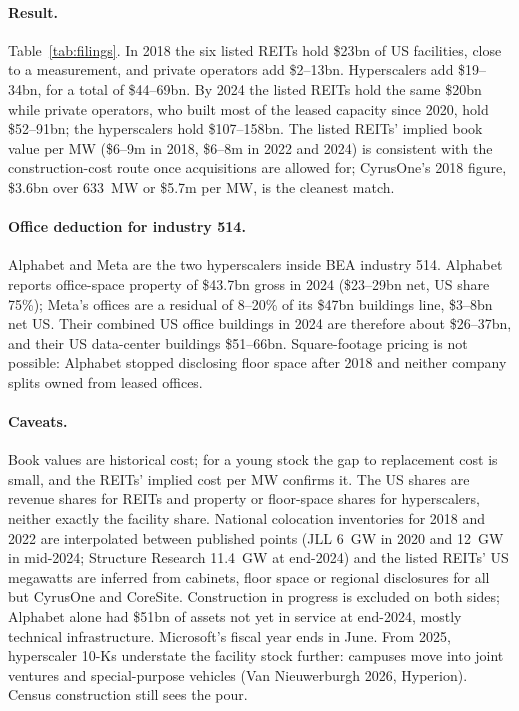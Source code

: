 \documentclass[11pt]{article}
\begin{document}
\paragraph{Result.} Table~\ref{tab:filings}. In 2018 the six listed REITs hold \$23bn of US facilities, close to a measurement, and private operators add \$2--13bn. Hyperscalers add \$19--34bn, for a total of \$44--69bn. By 2024 the listed REITs hold the same \$20bn while private operators, who built most of the leased capacity since 2020, hold \$52--91bn; the hyperscalers hold \$107--158bn. The listed REITs' implied book value per MW (\$6--9m in 2018, \$6--8m in 2022 and 2024) is consistent with the construction-cost route once acquisitions are allowed for; CyrusOne's 2018 figure, \$3.6bn over 633~MW or \$5.7m per MW, is the cleanest match.

\paragraph{Office deduction for industry 514.} Alphabet and Meta are the two hyperscalers inside BEA industry 514. Alphabet reports office-space property of \$43.7bn gross in 2024 (\$23--29bn net, US share 75\%); Meta's offices are a residual of 8--20\% of its \$47bn buildings line, \$3--8bn net US. Their combined US office buildings in 2024 are therefore about \$26--37bn, and their US data-center buildings \$51--66bn. Square-footage pricing is not possible: Alphabet stopped disclosing floor space after 2018 and neither company splits owned from leased offices.

\paragraph{Caveats.} Book values are historical cost; for a young stock the gap to replacement cost is small, and the REITs' implied cost per MW confirms it. The US shares are revenue shares for REITs and property or floor-space shares for hyperscalers, neither exactly the facility share. National colocation inventories for 2018 and 2022 are interpolated between published points (JLL 6~GW in 2020 and 12~GW in mid-2024; Structure Research 11.4~GW at end-2024) and the listed REITs' US megawatts are inferred from cabinets, floor space or regional disclosures for all but CyrusOne and CoreSite. Construction in progress is excluded on both sides; Alphabet alone had \$51bn of assets not yet in service at end-2024, mostly technical infrastructure. Microsoft's fiscal year ends in June. From 2025, hyperscaler 10-Ks understate the facility stock further: campuses move into joint ventures and special-purpose vehicles (Van Nieuwerburgh 2026, Hyperion). Census construction still sees the pour.
\end{document}

